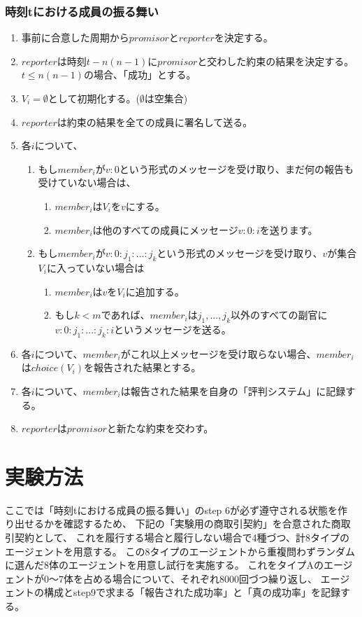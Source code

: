 \subsubsection{時刻tにおける成員の振る舞い}
\label{behaiverAtTimeT}
\begin{enumerate}
  \item 事前に合意した周期から$promisor$と$reporter$を決定する。
  \item $reporter$は時刻$t-n(n-1)$に$promisor$と交わした約束の結果を決定する。$t \leq n(n-1)$の場合、「成功」とする。
  \item $V_i=\emptyset$として初期化する。($\emptyset$は空集合)
  \item $reporter$は約束の結果を全ての成員に署名して送る。
  \item 各$i$について、 
  \begin{enumerate}
    \item もし$member_i$が$v:0$という形式のメッセージを受け取り、まだ何の報告も受けていない場合は、
    \begin{enumerate}
      \item $member_i$は$ V_i$を${v}$にする。 
      \item $member_i$は他のすべての成員にメッセージ$v:0:i$を送ります。
    \end{enumerate}
    \item もし$member_i$が$v:0:j_1:...:j_k$という形式のメッセージを受け取り、$v$が集合$V_i$に入っていない場合は
    \begin{enumerate}
      \item $member_i$は$v$を$V_i$に追加する。
      \item もし$k<m$であれば、$member_i$は$j_1, ..., j_k$以外のすべての副官に$v:0:j_1:...:j_k:i$というメッセージを送る。
    \end{enumerate}
  \end{enumerate}
  \item 各$i$について、$member_i$がこれ以上メッセージを受け取らない場合、$member_i$は$choice(V_i)$を報告された結果とする。
  \item 各$i$について、$member_i$は報告された結果を自身の「評判システム」に記録する。
  \item $reporter$は$promisor$と新たな約束を交わす。
\end{enumerate}

\section{実験方法}
  ここでは「時刻tにおける成員の振る舞い」のstep 6が必ず遵守される状態を作り出せるかを確認するため、
  下記の「実験用の商取引契約」を合意された商取引契約として、
  これを履行する場合と履行しない場合で4種づつ、計8タイプのエージェントを用意する。
  この8タイプのエージェントから重複問わずランダムに選んだ8体のエージェントを用意し試行を実施する。
  これをタイプAのエージェントが0〜7体を占める場合について、それぞれ8000回づつ繰り返し、
  エージェントの構成とstep9で求まる「報告された成功率」と「真の成功率」を記録する。

